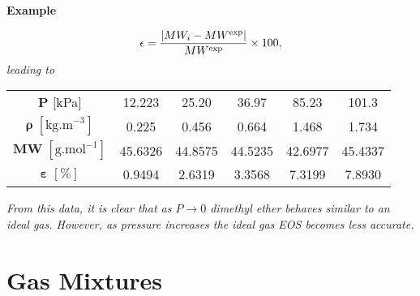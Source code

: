 \begin{MyExample}{\begin{center}{\bf Example}\end{center}}
\begin{example}
\begin{enumerate}[a)]
                 \begin{displaymath}
                      \epsilon = \displaystyle\frac{\left| MW_{i} - MW^{\text{exp}}\right|}{MW^{\text{exp}}}\times 100,
                 \end{displaymath}
                 {\it leading to}
               \begin{center}
                  \begin{tabular}{c |c c c c c}
                     $\mathbf{P}$ [kPa]                            & 12.223  & 25.20   & 36.97   & 85.23   & 101.3    \\
                     $\mathbf{\rho}\;\left[\text{kg.m}^{-3}\right]$ &  0.225  &  0.456  &  0.664  &  1.468  &   1.734  \\
                     $\mathbf{MW}\;\left[\text{g.mol}^{-1}\right]$  & 45.6326 & 44.8575 & 44.5235 & 42.6977 &  45.4337 \\
                     $\mathbf{\varepsilon}\;\left[\%\right]$       &  0.9494 &  2.6319 &  3.3568 &  7.3199 &   7.8930
                  \end{tabular}
               \end{center}
               {\it From this data, it is clear that as $P\rightarrow 0$ dimethyl ether behaves similar to an ideal gas. However, as pressure increases the ideal gas EOS becomes less accurate.} 

                
       \end{enumerate}

           
     \end{example}
   \end{MyExample}
   

   \section{Gas Mixtures}\label{Chapter:Intro_Property_of_Gases:Section:MixtureGases}

